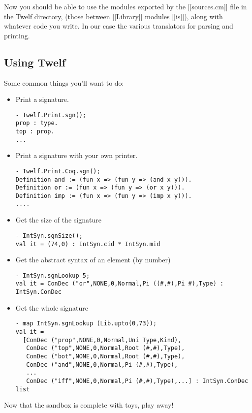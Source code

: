Now you should be able to use the modules exported
by the [[sources.cm]] file in the Twelf directory, 
(those between [[Library]] modules [[is]]),
along with whatever code you write.  In our case
the various translators for parsing and printing.

\subsection{Using Twelf}

Some common things you'll want to do:

\begin{itemize} 
\item Print a signature.

\begin{verbatim} 
- Twelf.Print.sgn();
prop : type.
top : prop.
...
\end{verbatim} 

\item Print a signature with your own printer.

\begin{verbatim} 
- Twelf.Print.Coq.sgn();
Definition and := (fun x => (fun y => (and x y))).
Definition or := (fun x => (fun y => (or x y))).
Definition imp := (fun x => (fun y => (imp x y))).
....
\end{verbatim} 

\item Get the size of the signature

\begin{verbatim} 
- IntSyn.sgnSize();
val it = (74,0) : IntSyn.cid * IntSyn.mid
\end{verbatim} 

\item Get the abstract syntax of an element (by number)
\begin{verbatim} 
- IntSyn.sgnLookup 5;
val it = ConDec ("or",NONE,0,Normal,Pi ((#,#),Pi #),Type) : IntSyn.ConDec
\end{verbatim} 

\item Get the whole signature
\begin{verbatim} 
- map IntSyn.sgnLookup (Lib.upto(0,73));
val it =
  [ConDec ("prop",NONE,0,Normal,Uni Type,Kind),
   ConDec ("top",NONE,0,Normal,Root (#,#),Type),
   ConDec ("bot",NONE,0,Normal,Root (#,#),Type),
   ConDec ("and",NONE,0,Normal,Pi (#,#),Type),
   ...
   ConDec ("iff",NONE,0,Normal,Pi (#,#),Type),...] : IntSyn.ConDec list
\end{verbatim} 

\end{itemize} 

Now that the sandbox is complete with toys, play away!
